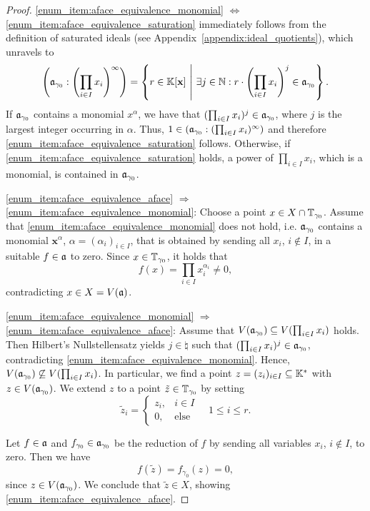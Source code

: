 \begin{proof}
	\ref{enum_item:aface_equivalence_monomial} $\Leftrightarrow$ \ref{enum_item:aface_equivalence_saturation} immediately follows from the definition of saturated ideals (see Appendix~\ref{appendix:ideal_quotients}), which unravels to
	$$\left(\mathfrak{a}_{\gamma_0} : \left(\prod_{i\in I} x_i\right)^\infty\right) = \left\{r\in \mathbb{K}[\mathbf{x}]\ \middle|\ \exists j\in\mathbb{N}: r\cdot \left(\prod_{i\in I} x_i\right)^j \in \mathfrak{a}_{\gamma_0}\right\}.$$
	If $\mathfrak{a}_{\gamma_0}$ contains a monomial $x^\alpha$, we have that $(\prod_{i\in I} x_i)^j\in\mathfrak{a}_{\gamma_0}$, where $j$ is the largest integer occurring in $\alpha$. Thus, $1\in (\mathfrak{a}_{\gamma_0} : (\prod_{i\in I} x_i)^\infty)$ and therefore \ref{enum_item:aface_equivalence_saturation} follows. Otherwise, if \ref{enum_item:aface_equivalence_saturation} holds, a power of $\prod_{i\in I} x_i$, which is a monomial, is contained in $\mathfrak{a}_{\gamma_0}$.
	
	\ref{enum_item:aface_equivalence_aface} $\Rightarrow$ 
	\ref{enum_item:aface_equivalence_monomial}: Choose a point $x\in X\cap \mathbb{T}_{\gamma_0}$. Assume that \ref{enum_item:aface_equivalence_monomial} does not hold, i.e. $\mathfrak{a}_{\gamma_0}$ contains a monomial $\mathbf{x}^\alpha$, $\alpha = (\alpha_i)_{i\in I}$, that is obtained by sending all $x_i$, $i\notin I$, in a suitable $f\in\mathfrak{a}$ to zero.
	Since $x\in\mathbb{T}_{\gamma_0}$, it holds that
	$$f(x) = \prod_{i\in I} x_i^{\alpha_i} \neq 0,$$
	contradicting $x\in X = V(\mathfrak{a})$.
	
	\ref{enum_item:aface_equivalence_monomial} $\Rightarrow$ 
	\ref{enum_item:aface_equivalence_aface}: Assume that $V(\mathfrak{a}_{\gamma_0}) \subseteq V(\prod_{i\in I} x_i)$ holds. Then Hilbert's Nullstellensatz yields $j\in\natural$ such that $(\prod_{i\in I} x_i)^j\in\mathfrak{a}_{\gamma_0}$, contradicting \ref{enum_item:aface_equivalence_monomial}. Hence, $V(\mathfrak{a}_{\gamma_0}) \not\subseteq V(\prod_{i\in I} x_i)$. In particular, we find a point $z = (z_i)_{i\in I} \subseteq \mathbb{K}^*$ with $z\in V(\mathfrak{a}_{\gamma_0})$. We extend $z$ to a point $\tilde{z}\in\mathbb{T}_{\gamma_0}$ by setting
	$$\tilde{z}_i = \begin{cases}
	z_i, & i\in I \\
	0, & \text{else}
	\end{cases}\quad 1\leq i \leq r.$$
	
	Let $f\in\mathfrak{a}$ and $f_{\gamma_0}\in\mathfrak{a}_{\gamma_0}$ be the reduction of $f$ by sending all variables $x_i$, $i\notin I$, to zero. Then we have
	$$f(\tilde{z}) = f_{\gamma_0}(z) = 0,$$
	since $z\in V(\mathfrak{a}_{\gamma_0})$. We conclude that $\tilde{z}\in X$, showing \ref{enum_item:aface_equivalence_aface}.
\end{proof}

